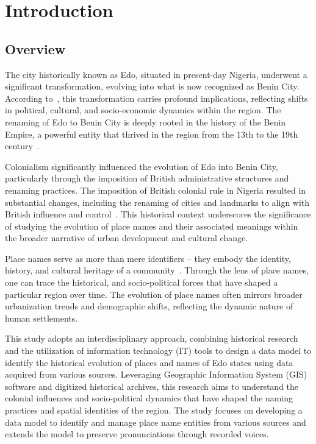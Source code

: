 \chapter{Introduction}
\section{Overview}
The city historically known as Edo, situated in present-day Nigeria, underwent a significant transformation, evolving into what is now recognized as Benin City. According to~\cite{Michael2023}, this transformation carries profound implications, reflecting shifts in political, cultural, and socio-economic dynamics within the region. The renaming of Edo to Benin City is deeply rooted in the history of the Benin Empire, a powerful entity that thrived in the region from the 13th to the 19th century~\cite{egharevba1968short}.

Colonialism significantly influenced the evolution of Edo into Benin City, particularly through the imposition of British administrative structures and renaming practices. The imposition of British colonial rule in Nigeria resulted in substantial changes, including the renaming of cities and landmarks to align with British influence and control~\cite{falola2008history}. This historical context underscores the significance of studying the evolution of place names and their associated meanings within the broader narrative of urban development and cultural change.

Place names serve as more than mere identifiers -- they embody the identity, history, and cultural heritage of a community~\cite{Gelling}. Through the lens of place names, one can trace the historical, and socio-political forces that have shaped a particular region over time. The evolution of place names often mirrors broader urbanization trends and demographic shifts, reflecting the dynamic nature of human settlements.

This study adopts an interdisciplinary approach, combining historical research and the utilization of information technology (IT) tools to design a data model to identify the historical evolution of places and names of Edo states using data acquired from various sources. Leveraging Geographic Information System (GIS) software and digitized historical archives, this research aims to understand the colonial influences and socio-political dynamics that have shaped the naming practices and spatial identities of the region. The study focuses on developing a data model to identify and manage place name entities from various sources and extends the model to preserve pronunciations through recorded voices.

